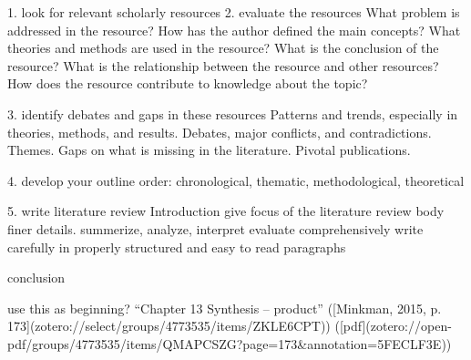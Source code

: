 1. look for relevant scholarly resources
2. evaluate the resources 
    What problem is addressed in the resource?
    How has the author defined the main concepts?
    What theories and methods are used in the resource?
    What is the conclusion of the resource?
    What is the relationship between the resource and other resources?
    How does the resource contribute to knowledge about the topic?

3. identify debates and gaps in these resources
    Patterns and trends, especially in theories, methods, and results.
    Debates, major conflicts, and contradictions.
    Themes.
    Gaps on what is missing in the literature.
    Pivotal publications.


4. develop your outline
order: chronological, thematic, methodological, theoretical
    

5. write literature review
    Introduction
        give focus of the literature review
    body
        finer details.
        summerize, analyze, interpret
        evaluate comprehensively
        write carefully in properly structured and easy to read paragraphs
        
    conclusion








use this as beginning?
“Chapter 13 Synthesis – product” ([Minkman, 2015, p. 173](zotero://select/groups/4773535/items/ZKLE6CPT)) ([pdf](zotero://open-pdf/groups/4773535/items/QMAPCSZG?page=173&annotation=5FECLF3E))

